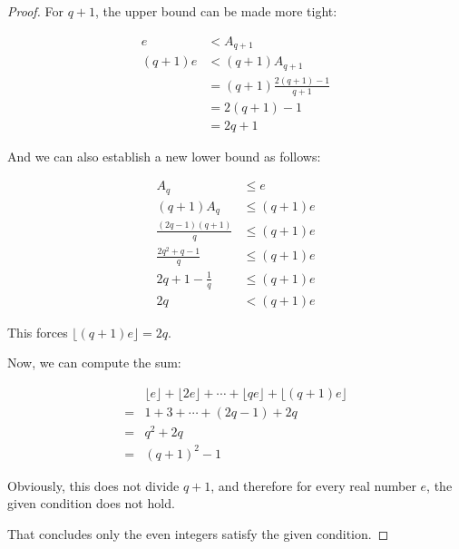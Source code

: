 \begin{proof}
For $ q + 1 $, the upper bound can be made more tight:

\begin{align*}
       e &< A_{q+1}                     \\
  (q+1)e &< (q+1)A_{q+1}                \\
         &= (q+1)\frac{2(q+1) - 1}{q+1} \\
         &= 2(q+1) - 1                  \\
         &= 2q + 1
\end{align*}

And we can also establish a new lower bound as follows:

\begin{align*}
                      A_{q} &\le e        \\
                 (q+1)A_{q} &\le (q + 1)e   \\
  \frac{(2q - 1)(q + 1)}{q} &\le (q + 1)e \\
     \frac{2q^2 + q - 1}{q} &\le (q + 1)e \\
       2q + 1 - \frac{1}{q} &\le (q + 1)e \\
                         2q &<   (q + 1)e
\end{align*}

This forces $ \lfloor (q+1)e \rfloor = 2q $.

Now, we can compute the sum:

\begin{align*}
    & \lfloor e \rfloor + \lfloor 2 e \rfloor + \cdots + \lfloor q e \rfloor + \lfloor (q+1) e \rfloor \\
   =& 1 + 3 + \cdots + (2q - 1) + 2q                                                                   \\
   =& q^2 + 2q                                                                                         \\
   =& (q+1)^2 - 1
 \end{align*}

 Obviously, this does not divide $ q + 1 $, and therefore for every real number $ e $, the given condition does not hold.

That concludes only the even integers satisfy the given condition.

\end{proof}
